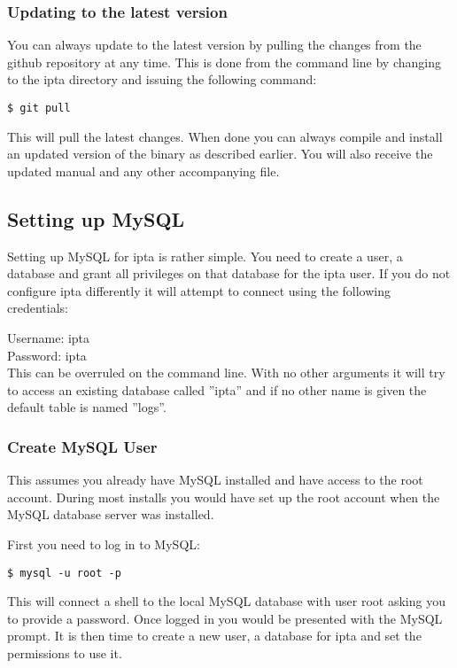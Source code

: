 \documentclass[english,twoside,openright,a4paper,12pt]{article}
\begin{document}
\subsubsection{Updating to the latest version}

You can always update to the latest version by pulling the changes from the github repository at any time. This is done from the command line by changing to the ipta directory and issuing the following command:

\begin{verbatim} 
$ git pull 
\end{verbatim}

This will pull the latest changes. When done you can always compile and install an updated version of the binary as described earlier. You will also receive the updated manual and any other accompanying file.

\subsection{Setting up MySQL}

Setting up MySQL for ipta is rather simple. You need to create a user, a database and grant all privileges on that database for the ipta user. If you do not configure ipta differently it will attempt to connect using the following credentials:

Username: ipta\\
Password: ipta\\

This can be overruled on the command line. With no other arguments it will try to access an existing database called ''ipta'' and if no other name is given the default table is named ''logs''.

\subsubsection{Create MySQL User}

This assumes you already have MySQL installed and have access to the root account. During most installs you would have set up the root account when the MySQL database server was installed.

First you need to log in to MySQL:

\begin{verbatim}
$ mysql -u root -p
\end{verbatim}

This will connect a shell to the local MySQL database with user root asking you to provide a password. Once logged in you would be presented with the MySQL prompt. It is then time to create a new user, a database for ipta and set the permissions to use it.
\end{document}
